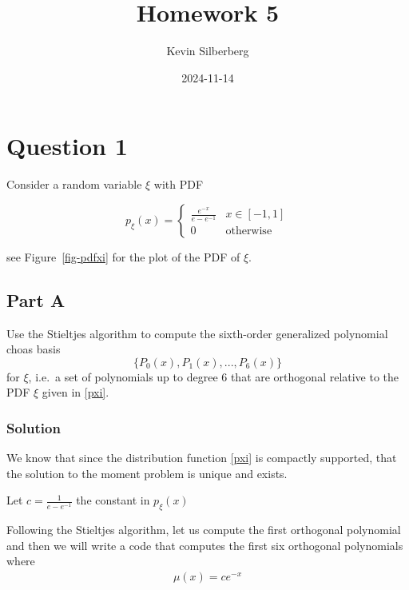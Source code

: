 \documentclass[
]{article}
\title{Homework 5}
\author{Kevin Silberberg}
\date{2024-11-14}
\renewcommand*\contentsname{Table of contents}
\newcommand\contentsname{Table of contents}
\begin{document}
\maketitle

\renewcommand*\contentsname{Table of contents}
{
\hypersetup{linkcolor=}
\setcounter{tocdepth}{3}
\tableofcontents
}

\section{Question 1}\label{question-1}

Consider a random variable \(\xi\) with PDF

\begin{equation}\tag{1}\label{pxi}
    p_{\xi}(x) = 
    \begin{cases}
        \frac{e^{-x}}{e - e^{-1}} & x \in [-1, 1] \\
        0 & \text{otherwise}
    \end{cases}
\end{equation}

see Figure~\ref{fig-pdfxi} for the plot of the PDF of \(\xi\).

\subsection{Part A}\label{part-a}

Use the Stieltjes algorithm to compute the sixth-order generalized
polynomial choas basis \[\{P_0(x), P_1(x), ..., P_6(x)\}\] for \(\xi\),
i.e.~a set of polynomials up to degree 6 that are orthogonal relative to
the PDF \(\xi\) given in \eqref{pxi}.

\subsubsection{Solution}\label{solution}

We know that since the distribution function \eqref{pxi} is compactly
supported, that the solution to the moment problem is unique and exists.

Let \(c = \frac{1}{e-e^{-1}}\) the constant in \(p_{\xi}(x)\)

Following the Stieltjes algorithm, let us compute the first orthogonal
polynomial and then we will write a code that computes the first six
orthogonal polynomials where \begin{align}
\mu(x) = ce^{-x}
\end{align}
\end{document}
